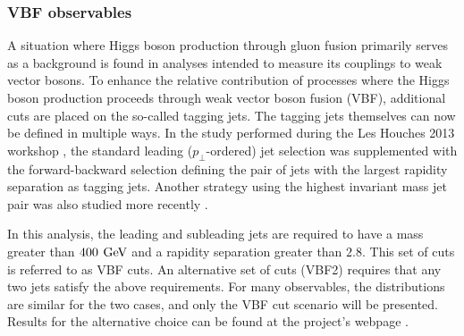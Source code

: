 \subsubsection{VBF observables}
\label{sec:hjetscomp:results:VBFobs}

A situation where Higgs boson production through gluon fusion primarily
serves as a background is found in analyses intended to measure its
couplings to weak vector bosons. To enhance the relative contribution
of processes where the Higgs boson production proceeds through weak
vector boson fusion (VBF), additional cuts are placed on the so-called
tagging jets. The tagging jets themselves can now be defined in
multiple ways. In the study performed during the Les Houches 2013
workshop \cite{AlcarazMaestre:2012vp}, the standard leading
($p_\perp$-ordered) jet selection was supplemented with the
forward-backward selection defining the pair of jets with the largest
rapidity separation as tagging jets. Another strategy using the
highest invariant mass jet pair was also studied more recently
\cite{Greiner:2015jha}.

In this analysis, the leading and subleading jets are required to have
a mass greater than $400\,\text{\:GeV}$ and a rapidity separation greater than
$2.8$. This set of cuts is referred to as VBF cuts. An alternative set
of cuts (VBF2) requires that any two jets satisfy the above
requirements. For many observables, the distributions are similar for
the two cases, and only the VBF cut scenario will be presented.
Results for the alternative choice can be found at the project's
webpage \cite{webpage}.

